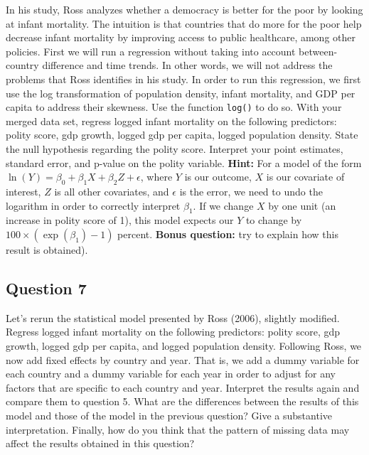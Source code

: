 \documentclass[]{article}
\begin{document}
In his study, Ross analyzes whether a democracy is better for the poor
by looking at infant mortality. The intuition is that countries that do
more for the poor help decrease infant mortality by improving access to
public healthcare, among other policies. First we will run a regression
without taking into account between-country difference and time trends.
In other words, we will not address the problems that Ross identifies in
his study. In order to run this regression, we first use the log
transformation of population density, infant mortality, and GDP per
capita to address their skewness. Use the function \texttt{log()} to do
so. With your merged data set, regress logged infant mortality on the
following predictors: polity score, gdp growth, logged gdp per capita,
logged population density. State the null hypothesis regarding the
polity score. Interpret your point estimates, standard error, and
p-value on the polity variable. \textbf{Hint:} For a model of the form
$\ln{(Y)} = \beta_0 + \beta_1 X + \beta_2 Z + \epsilon$, where $Y$ is
our outcome, $X$ is our covariate of interest, $Z$ is all other
covariates, and $\epsilon$ is the error, we need to undo the logarithm
in order to correctly interpret $\beta_1$. If we change $X$ by one unit
(an increase in polity score of 1), this model expects our $Y$ to change
by $100 \times (\exp(\beta_1) - 1)$ percent. \textbf{Bonus question:}
try to explain how this result is obtained).

\subsection{Question 7}\label{question-7}

Let's rerun the statistical model presented by Ross (2006), slightly
modified. Regress logged infant mortality on the following predictors:
polity score, gdp growth, logged gdp per capita, and logged population
density. Following Ross, we now add fixed effects by country and year.
That is, we add a dummy variable for each country and a dummy variable
for each year in order to adjust for any factors that are specific to
each country and year. Interpret the results again and compare them to
question 5. What are the differences between the results of this model
and those of the model in the previous question? Give a substantive
interpretation. Finally, how do you think that the pattern of missing
data may affect the results obtained in this question?
\end{document}
